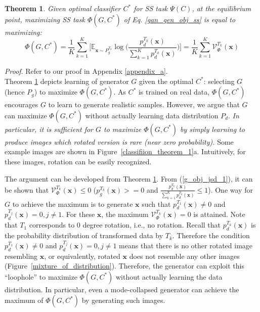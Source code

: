\documentclass{article}
\newtheorem{theorem}{Theorem}
\begin{document}
\begin{theorem}
Given optimal classifier $C^*$ for SS task $\Psi(C)$,
at the equilibrium point, maximizing SS task $\Phi(G,C^*)$ of Eq. \ref{gan_gen_obj_ss} is equal to maximizing:
\begin{equation}
\Phi(G,C^*) =  \frac{1}{K}\sum_{k=1}^{K} \bigg[\mathbb{E}_{\mathbf{x} \sim {P_g^{T_k}}}\log\Big(\frac{p_d^{T_k}(\mathbf{x})}{\sum_{k=1}^{K}p_d^{T_k}(\mathbf{x})}\Big)\bigg] 
= \frac{1}{K}\sum_{k=1}^{K}\mathcal{V}_{\Phi}^{T_k}(\mathbf{x})
\label{g_obj_jsd_1}
\end{equation}
\label{theorem_1}
\end{theorem}
\noindent \textit{Proof}. Refer to our proof in Appendix \ref{appendix_a}.\\

Theorem \ref{theorem_1} depicts learning of generator $G$
given the optimal $C^*$: selecting $G$ (hence $P_g$) to 
maximize $\Phi(G,C^*)$.
As $C^*$ is trained on real data,  $\Phi(G,C^*)$ encourages  $G$ to learn to generate realistic samples. However, we argue that $G$ can maximize $\Phi(G,C^*)$ without actually learning data distribution $P_d$. 
{\em In particular, it is sufficient for $G$ to  maximize $\Phi(G,C^*)$ by  simply learning to produce images which rotated version is rare (near zero probability).} Some example images are shown in Figure~\ref{classifiion_theorem_1}a. Intuitively, for these images, rotation can be easily recognized.

The argument can be developed from Theorem \ref{theorem_1}. From (\ref{g_obj_jsd_1}),
it can be shown that
$\mathcal{V}_{\Phi}^{T_k}(\mathbf{x}) \leq 0$ ($p_g^{T_k}(\mathbf{x}) >= 0$ and $\frac{p_d^{T_k}(\mathbf{x})}{\sum_{k=1}^{K}p_d^{T_k}(\mathbf{x})} \leq 1$).
One way for $G$ to achieve the maximum is to generate $\mathbf{x}$
such that 
$p_d^{T_1}(\mathbf{x}) \neq 0$ and 
$p_d^{T_j}(\mathbf{x}) = 0, j \neq 1$.
For these $\mathbf{x}$, the maximum 
$\mathcal{V}_{\Phi}^{T_k}(\mathbf{x}) = 0$ is attained. Note that $T_1$ corresponds to 0 degree rotation, i.e., no rotation.
Recall that 
$p_d^{T_k}(\mathbf{x})$ is the probability distribution of transformed data by $T_k$.
Therefore the condition 
$p_d^{T_1}(\mathbf{x}) \neq 0$ and $p_d^{T_j}(\mathbf{x}) = 0, j \neq 1$
means that there is no other rotated image resembling  $\mathbf{x}$, or equivalently, rotated $\mathbf{x}$ does not resemble any other images (Figure~\ref{mixture_of_distribution}). Therefore, the generator can exploit this ``loophole'' to maximize $\Phi(G,C^*)$ without actually learning the data distribution. 
In particular, even a mode-collapsed generator can achieve the maximum of $\Phi(G,C^*)$ by generating such images.
\end{document}
